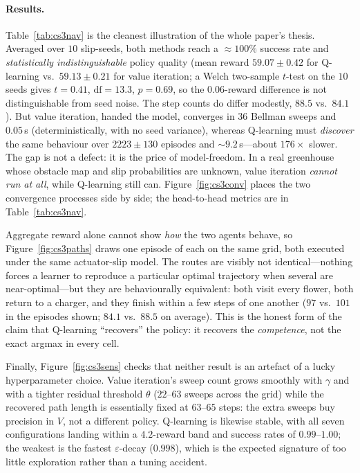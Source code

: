 \documentclass[10pt]{article}
\let\akparagraph\paragraph
\renewcommand{\paragraph}[1]{\Needspace*{4\baselineskip}\akparagraph{#1}}
\begin{document}
\paragraph{Results.}
Table~\ref{tab:cs3nav} is the cleanest illustration of the whole paper's thesis.
Averaged over $10$ slip-seeds, both methods reach a $\approx$$100\%$ success rate
and \emph{statistically indistinguishable} policy quality (mean reward
$59.07{\pm}0.42$ for Q-learning vs.\ $59.13{\pm}0.21$ for value iteration; a
Welch two-sample $t$-test on the $10$ seeds gives $t{=}0.41$, $\mathrm{df}{=}13.3$,
$p{=}0.69$, so the $0.06$-reward difference is not distinguishable from seed
noise. The step counts do differ modestly, $88.5$ vs.\ $84.1$). But value iteration,
handed the model, converges in $36$ Bellman sweeps and $0.05$\,s (deterministically,
with no seed variance), whereas Q-learning must \emph{discover} the same behaviour
over $2223{\pm}130$ episodes and $\sim$$9.2$\,s---about $176\times$ slower. The gap
is not a defect: it is the price of
model-freedom. In a real greenhouse whose obstacle map and slip probabilities are
unknown, value iteration \emph{cannot run at all}, while Q-learning still can.
Figure~\ref{fig:cs3conv} places the two convergence processes side by side; the
head-to-head metrics are in Table~\ref{tab:cs3nav}.

Aggregate reward alone cannot show \emph{how} the two agents behave, so
Figure~\ref{fig:cs3paths} draws one episode of each on the same grid, both
executed under the same actuator-slip model. The routes are visibly not
identical---nothing forces a learner to reproduce a particular optimal
trajectory when several are near-optimal---but they are behaviourally
equivalent: both visit every flower, both return to a charger, and they finish
within a few steps of one another ($97$ vs.\ $101$ in the episodes shown; $84.1$
vs.\ $88.5$ on average). This is the honest form of the claim that Q-learning
``recovers'' the policy: it recovers the \emph{competence}, not the exact
argmax in every cell.

Finally, Figure~\ref{fig:cs3sens} checks that neither result is an artefact of a
lucky hyperparameter choice. Value iteration's sweep count grows smoothly with
$\gamma$ and with a tighter residual threshold $\theta$ ($22$--$63$ sweeps across
the grid) while the recovered path length is essentially fixed at $63$--$65$
steps: the extra sweeps buy precision in $V$, not a different policy. Q-learning
is likewise stable, with all seven configurations landing within a $4.2$-reward
band and success rates of $0.99$--$1.00$; the weakest is the fastest
$\varepsilon$-decay ($0.998$), which is the expected signature of too little
exploration rather than a tuning accident.
\end{document}
